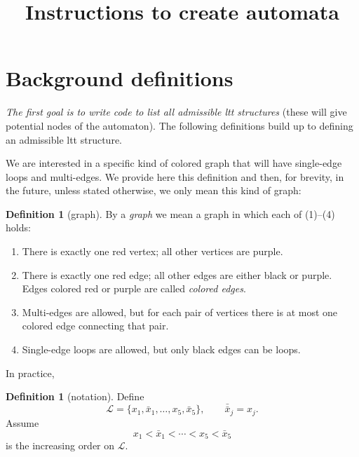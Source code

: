 \documentclass[11pt]{article}
\title{Instructions to create automata}
\author{}
\theoremstyle{definition}
\newtheorem{dfn}[thm]{Definition}
\begin{document}
\maketitle

\section*{Background definitions}

\noindent\emph{The first goal is to write code to list all admissible ltt structures}
(these will give potential nodes of the automaton). The following definitions build up to defining an admissible ltt structure.

We are interested in a specific kind of colored graph that will have single-edge loops and multi-edges. We provide here this definition and then, for brevity, in the future, unless stated otherwise, we only mean this kind of graph:

\begin{dfn}[graph]
By a \emph{graph} we mean a graph in which each of (1)--(4) holds:
\begin{enumerate}[label=\arabic*)]
  \item There is exactly one red vertex; all other vertices are purple.
  \item There is exactly one red edge; all other edges are either black or purple.
        Edges colored red or purple are called \emph{colored edges}.
  \item Multi-edges are allowed, but for each pair of vertices there is at most one
        colored edge connecting that pair.
  \item Single-edge loops are allowed, but only black edges can be loops.
\end{enumerate}
\end{dfn}

In practice, 

\begin{dfn}[notation]
Define
\[
\mathcal{L}=\{x_1,\bar{x}_1,\ldots,x_5,\bar{x}_5\},\qquad \bar{\bar{x}}_j=x_j.
\]
Assume
\[
x_1<\bar{x}_1<\cdots<x_5<\bar{x}_5
\]
is the increasing order on $\mathcal{L}$.
\end{dfn}
\end{document}
